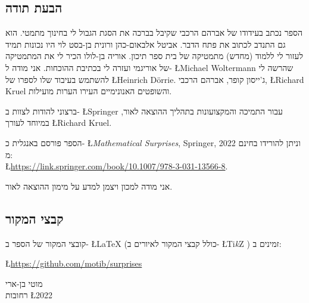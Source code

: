
\subsection*{הבעת תודה}

הספר נכתב בעידודו של אברהם הרכבי שקיבל בברכה את הסגת הגבול לי בחינוך מתמטי. הוא גם התנדב לכתוב את פתח הדבר. אביטל אלבאום-כהן ורונית בן-בסט לוי היו נכונות תמיד לעזור לי ללמוד (מחדש) מתמטיקה של בית ספר תיכון. אוריה בן-לולו הכיר לי את המתמטיקה של אוריגמי ועזרה לי בכתיבת ההוכחות. אני מודה ל-%
\L{Michael Woltermann}
שהרשה לי להשתמש בעיבוד שלו לספרו של
\L{Heinrich D\"{o}rrie}.
ג'ייסון קופר, אברהם הרכבי,
\L{Richard Kruel}
והשופטים האנונימיים העירו הערות מועילות.

ברצוני להודות לצוות ב-%
\L{Springer}
עבור התמיכה והמקצועונות בתהליך ההוצאה לאור, במיוחד לעורך
\L{Richard Kruel}.

הספר פורסם באנגלית כ-%
\L{\textit{Mathematical Surprises}, Springer, 2022}
וניתן להורידו בחינם מ:\\
\L{\url{https://link.springer.com/book/10.1007/978-3-031-13566-8}}.

אני מודה למכון ויצמן למדע על מימון ההוצאה לאור.

\subsection*{קבצי המקור}
קובצי המקור של הספר ב-%
\L{\LaTeX{}}
(כולל קבצי המקור לאיורים ב-%
\L{Ti\textit{k}Z}%
)
זמינים ב:
\begin{center}
\L{\url{https://github.com/motib/surprises}}
\end{center}

\medskip

\begin{flushleft}
מוטי בן-ארי
\\
רחובות
\L{2022}
\end{flushleft}

\tableofcontents

